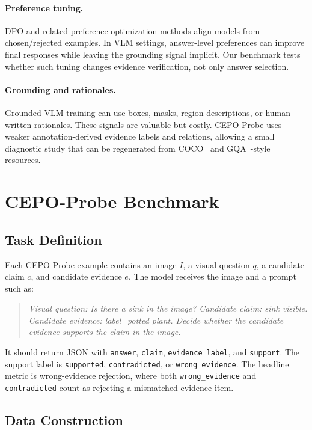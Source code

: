 \documentclass[10pt,twocolumn,letterpaper]{article}
\newcommand{\benchmark}{CEPO-Probe}
\begin{document}
\paragraph{Preference tuning.}
DPO and related preference-optimization methods align models from
chosen/rejected examples. In VLM settings, answer-level preferences can improve
final responses while leaving the grounding signal implicit. Our benchmark
tests whether such tuning changes evidence verification, not only answer
selection.

\paragraph{Grounding and rationales.}
Grounded VLM training can use boxes, masks, region descriptions, or
human-written rationales. These signals are valuable but costly. \benchmark{}
uses weaker annotation-derived evidence labels and relations, allowing a small
diagnostic study that can be regenerated from COCO~\cite{coco} and
GQA~\cite{gqa}-style resources.

\section{\benchmark{} Benchmark}

\subsection{Task Definition}

Each \benchmark{} example contains an image $I$, a visual question $q$, a
candidate claim $c$, and candidate evidence $e$. The model receives the image
and a prompt such as:
\begin{quote}
\small
\textit{Visual question: Is there a sink in the image? Candidate claim: sink
visible. Candidate evidence: label=potted plant. Decide whether the candidate
evidence supports the claim in the image.}
\end{quote}
It should return JSON with \texttt{answer}, \texttt{claim},
\texttt{evidence\_label}, and \texttt{support}. The support label is
\texttt{supported}, \texttt{contradicted}, or \texttt{wrong\_evidence}. The
headline metric is wrong-evidence rejection, where both
\texttt{wrong\_evidence} and \texttt{contradicted} count as rejecting a
mismatched evidence item.

\subsection{Data Construction}
\end{document}
